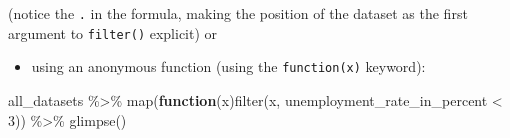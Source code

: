 \documentclass[
]{article}
\newenvironment{Shaded}{\begin{snugshade}}{\end{snugshade}}
\newcommand{\ControlFlowTok}[1]{\textcolor[rgb]{0.13,0.29,0.53}{\textbf{#1}}}
\newcommand{\DecValTok}[1]{\textcolor[rgb]{0.00,0.00,0.81}{#1}}
\newcommand{\FunctionTok}[1]{\textcolor[rgb]{0.00,0.00,0.00}{#1}}
\newcommand{\NormalTok}[1]{#1}
\newcommand{\SpecialCharTok}[1]{\textcolor[rgb]{0.00,0.00,0.00}{#1}}
\providecommand{\tightlist}{%
  \setlength{\itemsep}{0pt}\setlength{\parskip}{0pt}}
\begin{document}
(notice the \texttt{.} in the formula, making the position of the dataset as the first argument to \texttt{filter()}
explicit) or

\begin{itemize}
\tightlist
\item
  using an anonymous function (using the \texttt{function(x)} keyword):
\end{itemize}

\begin{Shaded}
\begin{Highlighting}[]
\NormalTok{all\_datasets }\SpecialCharTok{\%\textgreater{}\%}
  \FunctionTok{map}\NormalTok{(}\ControlFlowTok{function}\NormalTok{(x)}\FunctionTok{filter}\NormalTok{(x, unemployment\_rate\_in\_percent }\SpecialCharTok{\textless{}} \DecValTok{3}\NormalTok{)) }\SpecialCharTok{\%\textgreater{}\%}
  \FunctionTok{glimpse}\NormalTok{()}
\end{Highlighting}
\end{Shaded}
\end{document}
